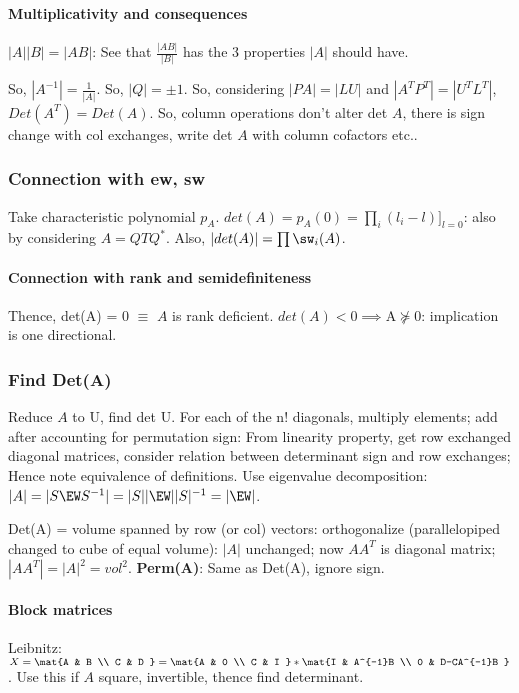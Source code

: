 \documentclass[oneside, article]{memoir}
\begin{document}
\paragraph*{Multiplicativity and consequences}
$|A||B|=|AB|$: See that $\frac{|AB|}{|B|}$ has the 3 properties $|A|$ should have.

So, $|A^{-1}| = \frac{1}{|A|}$. So, $|Q|= \pm 1$. So, considering $|PA| = |LU|$ and $|A^{T}P^{T}| = |U^{T}L^{T}|$, $Det(A^{T}) = Det(A)$. So, column operations don't alter det $A$, there is sign change with col exchanges, write det $A$ with column cofactors etc..

\subsubsection{Connection with ew, sw}
Take characteristic polynomial $p_A$. $det(A) = p_{A}(0) = \prod_{i} (l_{i}-l)]_{l=0}$: also by considering $A = QTQ^{*}$. Also, $|det(A)| = \prod \sw_i(A)$.

\paragraph*{Connection with rank and semidefiniteness}
Thence, det(A) = 0 $\equiv$ $A$ is rank deficient. $det(A) < 0 \implies $A$ \nsucceq 0$: implication is one directional.

\subsubsection{Find Det(A)}
Reduce $A$ to U, find det U. For each of the n! diagonals, multiply elements; add after accounting for permutation sign: From linearity property, get row exchanged diagonal matrices, consider relation between determinant sign and row exchanges; Hence note equivalence of definitions. Use eigenvalue decomposition: $|A|=|S\EW S^{-1}|=|S||\EW||S|^{-1} = |\EW|$.

Det(A) = volume spanned by row (or col) vectors: orthogonalize (parallelopiped changed to cube of equal volume): $|A|$ unchanged; now $AA^{T}$ is diagonal matrix; $|AA^{T}| = |A|^{2} = vol^{2}$. \textbf{Perm(A)}: Same as Det(A), ignore sign.

\paragraph*{Block matrices}
Leibnitz: \\
$X = \mat{A & B \\ C & D } = \mat{A & 0 \\ C & I } * \mat{I & A^{-1}B \\ 0 & D-CA^{-1}B }$. Use this if $A$ square, invertible, thence find determinant.
\end{document}
